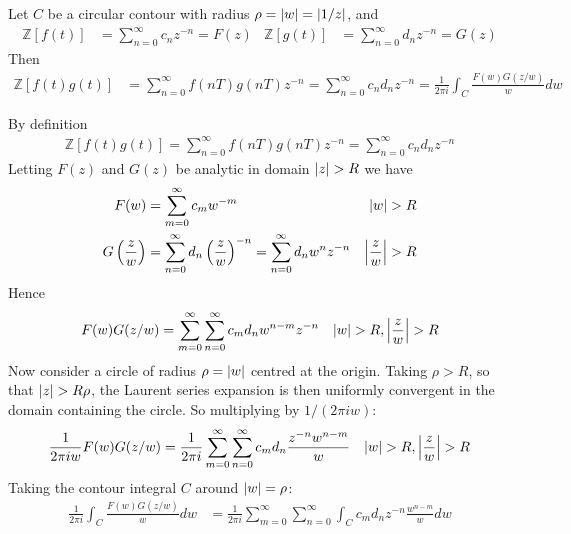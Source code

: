 \documentclass[12pt, english]{book}
\makeatletter
\renewenvironment{proof}[1][\proofname]{\par
	\pushQED{\qed}%
	\normalfont \topsep6\p@\@plus6\p@\relax
	\list{}{%
		\settowidth{\leftmargin}{\itshape\proofname:\hskip\labelsep}%
		\setlength{\labelwidth}{0pt}%
		\setlength{\itemindent}{-\leftmargin}%
	}%
	\item[\hskip\labelsep\itshape#1\@addpunct{:}]\ignorespaces
	}{ \popQED\endlist\@endpefalse}
\makeatother
\begin{document}
	\begin{definition}
		Let \(C\) be a circular contour with radius \(\rho = \abs{w} = \abs{1/z}\), and
		\begin{align*}
			\mathbb{Z}[f(t)] &= \sum_{n=0}^{\infty} c_n z^{-n} = F(z) &
			\mathbb{Z}[g(t)] &= \sum_{n=0}^{\infty} d_n z^{-n} = G(z)
		\end{align*}
		Then
		\begin{align*}
			\mathbb{Z}[f(t)g(t)] 
			&= \sum_{n=0}^{\infty} f(nT) g(nT) z^{-n} = \sum_{n=0}^{\infty} c_n d_n z^{-n}
			 = \frac{1}{2\pi i} \int_{C} \frac{F(w)G(z/w)}{w} dw
		\end{align*}
	\end{definition}
	\begin{proof}
		By definition 
		\begin{align*}
			\mathbb{Z}[f(t)g(t)] = \sum_{n=0}^{\infty} f(nT) g(nT) z^{-n} = \sum_{n=0}^{\infty} c_n d_n z^{-n}
		\end{align*}
		Letting \(F(z)\) and \(G(z)\) be analytic in domain \(\abs{z}>R\) we have
		\begin{align*}
			F(w) &= \sum_{m=0}^{\infty} c_m w^{-m} & \abs{w} > R \\
			G\left(\frac{z}{w}\right) &= \sum_{n=0}^{\infty} d_n \left(\frac{z}{w}\right)^{-n} = \sum_{n=0}^{\infty} d_n w^n z^{-n} & \abs{\frac{z}{w}} > R
		\end{align*}
		Hence
		\begin{align*}
			F(w) G(z/w) &= \sum_{m=0}^{\infty} \sum_{n=0}^{\infty} c_m d_n w^{n-m} z^{-n}
				& \abs{w}>R, \abs{\frac{z}{w}}> R
		\end{align*}
		Now consider a circle of radius \(\rho = \abs{w}\) centred at the origin. Taking \(\rho > R\), so that \(\abs{z} > R\rho\), the Laurent series expansion is then uniformly convergent in the domain containing the circle. So multiplying by \(1/(2\pi i w)\):
		\begin{align*}
			\frac{1}{2\pi i w} F(w) G(z/w) 
			&= \frac{1}{2\pi i}\sum_{m=0}^{\infty} \sum_{n=0}^{\infty} c_m d_n \frac{z^{-n} w^{n-m}}{w}
				& \abs{w}>R, \abs{\frac{z}{w}}> R
		\end{align*}
		Taking the contour integral \(C\) around \(\abs{w} = \rho\):
		\begin{align*}
			\frac{1}{2\pi i} \int_{C} \frac{F(w)G(z/w)}{w} dw 
			&= \frac{1}{2\pi i} \sum_{m=0}^{\infty} \sum_{n=0}^{\infty} \int_{C} c_m d_n z^{-n} \frac{w^{n-m}}{w} dw
		\end{align*}

\end{proof}
\end{document}
